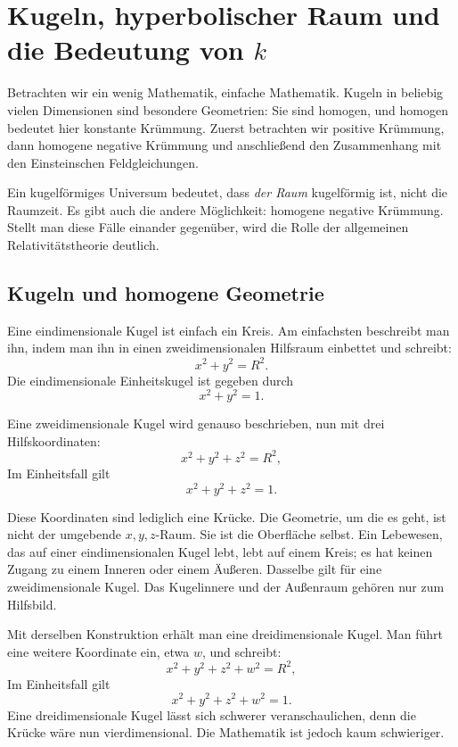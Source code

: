 \chapter{Kugeln, hyperbolischer Raum und die Bedeutung von \(k\)}

Betrachten wir ein wenig Mathematik, einfache Mathematik. Kugeln in beliebig vielen Dimensionen sind besondere Geometrien: Sie sind homogen, und homogen bedeutet hier konstante Krümmung. Zuerst betrachten wir positive Krümmung, dann homogene negative Krümmung und anschließend den Zusammenhang mit den Einsteinschen Feldgleichungen.

Ein kugelförmiges Universum bedeutet, dass \emph{der Raum} kugelförmig ist, nicht die Raumzeit. Es gibt auch die andere Möglichkeit: homogene negative Krümmung. Stellt man diese Fälle einander gegenüber, wird die Rolle der allgemeinen Relativitätstheorie deutlich.

\section{Kugeln und homogene Geometrie}

Eine eindimensionale Kugel ist einfach ein Kreis. Am einfachsten beschreibt man ihn, indem man ihn in einen zweidimensionalen Hilfsraum einbettet und schreibt:
\begin{equation}
x^2+y^2=R^2.
\end{equation}
Die eindimensionale Einheitskugel ist gegeben durch
\begin{equation}
x^2+y^2=1.
\end{equation}

Eine zweidimensionale Kugel wird genauso beschrieben, nun mit drei Hilfskoordinaten:
\begin{equation}
x^2+y^2+z^2=R^2,
\end{equation}
Im Einheitsfall gilt
\begin{equation}
x^2+y^2+z^2=1.
\end{equation}

Diese Koordinaten sind lediglich eine Krücke. Die Geometrie, um die es geht, ist nicht der umgebende \(x,y,z\)-Raum. Sie ist die Oberfläche selbst. Ein Lebewesen, das auf einer eindimensionalen Kugel lebt, lebt auf einem Kreis; es hat keinen Zugang zu einem Inneren oder einem Äußeren. Dasselbe gilt für eine zweidimensionale Kugel. Das Kugelinnere und der Außenraum gehören nur zum Hilfsbild.

Mit derselben Konstruktion erhält man eine dreidimensionale Kugel. Man führt eine weitere Koordinate ein, etwa \(w\), und schreibt:
\begin{equation}
x^2+y^2+z^2+w^2=R^2,
\end{equation}
Im Einheitsfall gilt
\begin{equation}
x^2+y^2+z^2+w^2=1.
\end{equation}
Eine dreidimensionale Kugel lässt sich schwerer veranschaulichen, denn die Krücke wäre nun vierdimensional. Die Mathematik ist jedoch kaum schwieriger.

